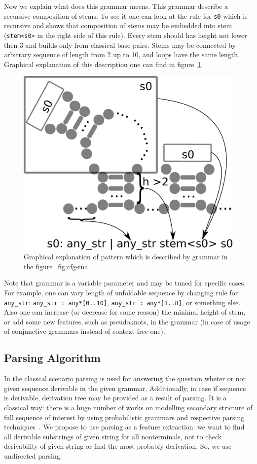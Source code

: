 \documentclass[a4paper,twoside]{article}
\begin{document}
Now we explain what does this grammar meens.
This grammar describe a recursive composition of stems.
To see it one can look at the rule for \verb|s0| which is recursive and shows that composition of stems may be embedded into stem (\verb |stem<s0>| in the right side of this rule).
Every stem should has height not lower then 3 and builds only from classical base pairs.
Stems may be connected by arbitrary sequence of length from 2 up to 10, and loops have the same length.
Graphical explanation of this description one can find in figure~\ref{fig:cfg-rna-graphical}.

\begin{figure}
\centering
\includegraphics[width=.5\textwidth]{figures/16sgrammar.pdf}
\caption{Graphical explanation of pattern which is described by grammar in the figure~\ref{fig:cfg-rna}}
\label{fig:cfg-rna-graphical}
\end{figure}

Note that grammar is a variable parameter and may be tuned for specific cases.
For example, one can vary length of unfoldable sequence by changing rule for \verb|any_str|: \verb|any_str : any*[0..10]|, \verb|any_str : any*[1..8]|, or something else.
Also one can increase (or decrease for some reason) the minimal height of stem, or add some new features, such as pseudoknots, in the grammar (in case of usage of conjunctive grammars instead of context-free one).


\subsection{Parsing Algorithm}

\noindent In the classcal scenario parsing is used for answering the question wheter or not given sequence derivable in the given grammar.
Additionally, in case if sequence is derivable, derivation tree may be provided as a result of parsing. 
It is a classical way: there is a huge number of works on modelling secondary stricture of full sequence of interest by using probabilistic grammars and respective parsing techniques~\cite{}.
We propose to use parsing as a feature extraction: we want to find all derivable substrings of given string for all nonterminals, not to check derivability of given string or find the most probably derivation.
So, we use undirected parsing.
\end{document}
